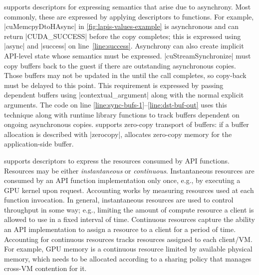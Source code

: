 { \Speclang supports descriptors
for expressing semantics that arise due to asynchrony.
Most commonly, these are expressed by applying descriptors to functions.
For example, \spec|cuMemcpyDtoHAsync| in \autoref{fig:lapis-values-example}
is asynchronous and can return \spec|CUDA_SUCCESS| before the copy completes;
this is expressed using \spec|async| and \spec|success| on line~\ref{line:success}.
Asynchrony can also create implicit API-level state whose semantics must be expressed.
\spec|cuStreamSynchronize| must copy buffers back to the guest if there are outstanding asynchronous copies.
Those buffers may not be updated in the \worker until the call completes, so copy-back must be delayed to this point.
This requirement is expressed by passing dependent buffers using \spec|contextual_argument| along with the normal explicit arguments. The \speclang code on line \ref{line:sync-bufs-1}--\ref{line:dst-buf-out}
uses this technique along with runtime library functions to track buffers dependent on ongoing asynchronous copies.
\Model supports zero-copy transport of buffers: if a buffer allocation is described with \spec|zerocopy|, \compiler allocates zero-copy memory for the application-side buffer.

\Speclang supports descriptors to express the resources consumed by API functions.
Resources may be either \emph{instantaneous} or \emph{continuous}.
Instantaneous resources are consumed by an API function implementation only once,
e.g., by executing a GPU kernel upon request. Accounting works by measuring resources used at each function invocation.
In general, instantaneous resources are used to control throughput in some way; e.g.,
limiting the amount of compute resource a client is allowed to use in a fixed interval of time.
Continuous resources capture the ability an API implementation to assign a resource to a client for a
period of time. Accounting for continuous resources tracks resources assigned to each client/VM.
For example, GPU memory is a continuous resource limited by available physical memory,
which needs to be allocated
according to a sharing policy that manages cross-VM contention for it.

}
